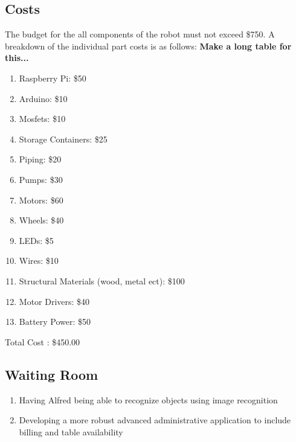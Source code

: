 \documentclass [11pt]{article}
\begin{document}
\subsection{Costs}	
The budget for the all components of the robot must not exceed \$750. A breakdown of the individual part costs is as follows:
\textbf{Make a long table for this...}
		\begin{enumerate}[label=\textbf{\Alph*}:]
			\item Raspberry Pi: \$50
			\item Arduino: \$10
			\item Mosfets: \$10
			\item Storage Containers: \$25
			\item Piping: \$20
			\item Pumps: \$30
			\item Motors: \$60
			\item Wheels: \$40
			\item LEDs: \$5
			\item Wires: \$10
			\item Structural Materials (wood, metal ect): \$100
			\item Motor Drivers: \$40
			\item Battery Power: \$50
			\end{enumerate}
		
		Total Cost : \$450.00


\subsection{Waiting Room}
	\begin{enumerate}[label=\textbf{(\roman*)}]
		\item Having Alfred being able to recognize objects using image recognition
		\item Developing a more robust advanced administrative application to include billing and table availability
	    \end{enumerate} 

\end{document}
